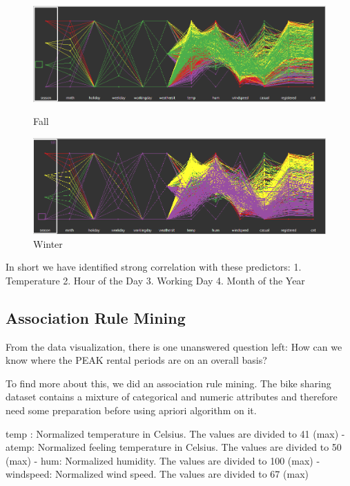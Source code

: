 \documentclass[12pt]{article}
\begin{document}
		\begin{figure}[H]
			\centering
			\begin{minipage}{.5\textwidth}
				\centering
				\includegraphics[width=\linewidth]{figures/fall_pcor.png}
				\caption{Fall}
			\end{minipage}%
			\begin{minipage}{.5\textwidth}
				\centering
				\includegraphics[width=\linewidth]{figures/winter_pcor.png}
				\caption{Winter}
			\end{minipage}
		\end{figure}
	In short we have identified strong correlation with these predictors: 1. Temperature 2. Hour of the Day 3. Working Day 4. Month of the Year
	
	\subsection{Association Rule Mining}
	From the data visualization, there is one unanswered question left: How can we know where the PEAK rental periods are on an overall basis?
	
	To find more about this, we did an association rule mining. The bike sharing dataset contains a mixture of categorical and numeric attributes and therefore need some preparation before using apriori algorithm on it.
	
	temp : Normalized temperature in Celsius. The values are divided to 41 (max)
	- atemp: Normalized feeling temperature in Celsius. The values are divided to 50 (max)
	- hum: Normalized humidity. The values are divided to 100 (max)
	- windspeed: Normalized wind speed. The values are divided to 67 (max)
	
\end{document}
